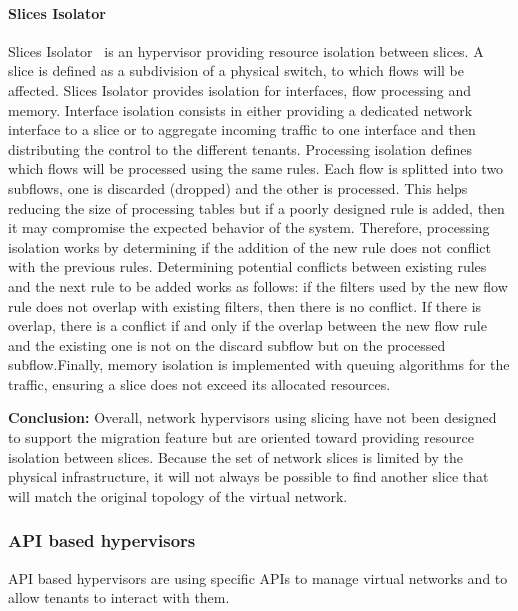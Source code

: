 \paragraph{Slices Isolator}
Slices Isolator~\cite{SlicesIsolator-El-Azzab2011} is an hypervisor providing resource isolation between slices. A slice is defined as a subdivision of a physical switch, to which flows will be affected. Slices Isolator provides isolation for interfaces, flow processing and memory. Interface isolation consists in either providing a dedicated network interface to a slice or to aggregate incoming traffic to one interface and then distributing the control to the different tenants. Processing isolation defines which flows will be processed using the same rules. Each flow is splitted into two subflows, one is discarded (dropped) and the other is processed. This helps reducing the size of processing tables but if a poorly designed rule is added, then it may compromise the expected behavior of the system. Therefore, processing isolation works by determining if the addition of the new rule does not conflict with the previous rules. Determining potential conflicts between existing rules and the next rule to be added works as follows: if the filters used by the new flow rule does not overlap with existing filters, then there is no conflict.
If there is overlap, there is a conflict if and only if the overlap between the new flow rule and the existing one is not on the discard subflow but on the processed subflow.Finally, memory isolation is implemented with queuing algorithms for the traffic, ensuring a slice does not exceed its allocated resources. 

\textbf{Conclusion:} Overall, network hypervisors using slicing have not been designed to support the migration feature but are oriented toward providing resource isolation between slices. Because the set of network slices is limited by the physical infrastructure, it will not always be possible to find another slice that will match the original topology of the virtual network.

\subsubsection{API based hypervisors}
API based hypervisors are using specific APIs to manage virtual networks and to allow tenants to interact with them.

